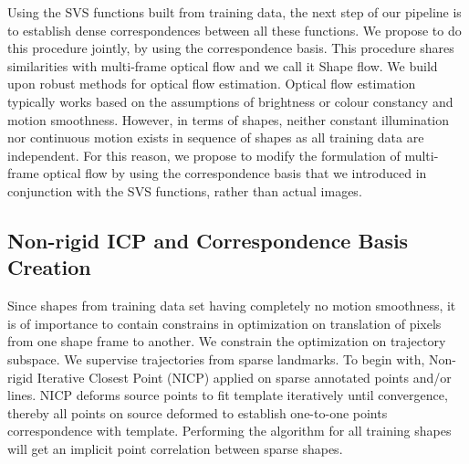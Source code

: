 Using the SVS functions built from training data, the next step of our pipeline is to establish dense correspondences between all these functions. We propose to do this procedure jointly, by using the correspondence basis. This procedure shares similarities with multi-frame optical flow and we call it Shape flow. We build upon robust methods for  optical flow estimation. Optical flow estimation typically works based on the assumptions of brightness or colour constancy and motion smoothness. However, in terms of shapes, neither constant illumination nor continuous motion exists in sequence of shapes as all training data are independent. 
For this reason, we propose to modify the formulation of multi-frame optical flow by using the correspondence basis that we introduced in conjunction with the SVS functions, rather than actual images.

\subsection{Non-rigid ICP and Correspondence Basis Creation} \label{sec:trabasis}
Since shapes from training data set having completely no motion smoothness, it is of importance to contain constrains in optimization on translation of pixels from one shape frame to another. We constrain the optimization on trajectory subspace.
We supervise trajectories from sparse landmarks. To begin with, Non-rigid Iterative Closest Point (NICP)\cite{Amberg2007} applied on sparse annotated points and/or lines. NICP deforms source points to fit template iteratively until convergence, thereby all points on source deformed to establish one-to-one points correspondence with template. Performing the algorithm for all training shapes will get an implicit point correlation between sparse shapes.

